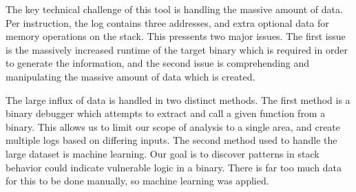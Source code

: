 \documentclass{article}
\begin{document}
The key technical challenge of this tool is handling the massive amount of data.  Per instruction, the log contains
three addresses, and extra optional data for memory operations on the stack. This pressents two major issues. The first
issue is the massively increased runtime of the target binary which is required in order to generate the information,
and the second issue is comprehending and manipulating the massive amount of data which is created.

The large influx of data is handled in two distinct methods. The first method is a binary debugger which attempts to
extract and call a given function from a binary. This allows us to limit our scope of analysis to a single area, and
create multiple logs based on differing inputs. The second method used to handle the large dataset is machine learning.
Our goal is to discover patterns in stack behavior could indicate vulnerable logic in a binary. There is far too much
data for this to be done manually, so machine learning was applied.
\end{document}
